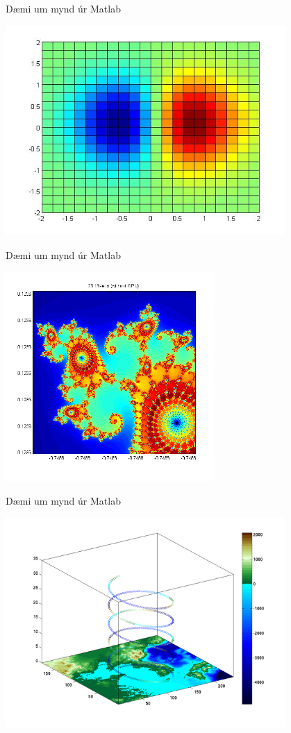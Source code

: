 \documentclass[handout]{beamer}
\begin{document}
\begin{frame}{Dæmi um mynd úr Matlab}
\begin{center}
\includegraphics[width=0.8\textwidth]{Pics/plot-example2}
\end{center}
\end{frame}

\begin{frame}{Dæmi um mynd úr Matlab}
\begin{center}
\vspace{\baselineskip}
\includegraphics[width=0.6\textwidth]{Pics/plot-example3}
\end{center}
\end{frame}

\begin{frame}{Dæmi um mynd úr Matlab}
\begin{center}
\includegraphics[width=0.8\textwidth]{Pics/plot-example4}
\end{center}
\end{frame}
\end{document}
